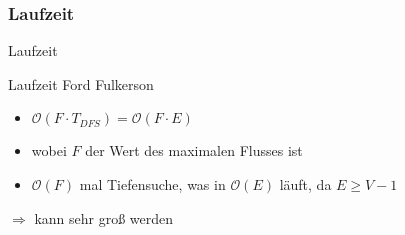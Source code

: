 \subsubsection{Laufzeit}
\begin{frame}{Laufzeit}
  \begin{block}{Laufzeit Ford Fulkerson}
      \begin{itemize}
        \item $\mathcal{O}(F\cdot T_{DFS}) = \mathcal{O}(F\cdot E)$
        \pause
        \item wobei $F$ der Wert des maximalen Flusses ist
        \pause
        \item $\mathcal{O}(F)$ mal Tiefensuche, was in $\mathcal{O}(E)$ läuft, da $E \geq V - 1$
      \end{itemize}
      \pause
      $\Rightarrow$ kann sehr groß werden
  \end{block}
\end{frame}
